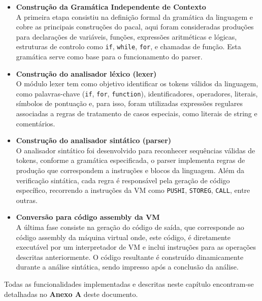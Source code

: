 \documentclass[12pt,a4paper]{report}%
\begin{document}
\begin{itemize}
    \item \textbf{Construção da Gramática Independente de Contexto}\\
    A primeira etapa consistiu na definição formal da gramática da linguagem e cobre as principais construções do pacal, aqui foram consideradas produções para declarações de variáveis, funções, expressões aritméticas e lógicas, estruturas de controlo como \texttt{if}, \texttt{while}, \texttt{for}, e chamadas de função. Esta gramática serve como base para o funcionamento do parser.
    
    \item \textbf{Construção do analisador léxico (lexer)}\\
    O módulo lexer tem como objetivo identificar os tokens válidos da linguagem, como palavras-chave (\texttt{if}, \texttt{for}, \texttt{function}), identificadores, operadores, literais, símbolos de pontuação e, para isso, foram utilizadas expressões regulares associadas a regras de tratamento de casos especiais, como literais de string e comentários.
    
    \item \textbf{Construção do analisador sintático (parser)}\\
    O analisador sintático foi desenvolvido para reconhecer sequências válidas de tokens, conforme a gramática especificada, o parser implementa regras de produção que correspondem a instruções e blocos da linguagem. 
    Além da verificação sintática, cada regra é responsável pela geração de código específico, recorrendo a instruções da VM como \texttt{PUSHI}, \texttt{STOREG}, \texttt{CALL}, entre outras.
    
    \item \textbf{Conversão para código assembly da VM}\\
    A última fase consiste na geração do código de saída, que corresponde ao código assembly da máquina virtual onde, este código, é diretamente executável por um interpretador de VM e inclui instruções para as operações descritas anteriormente. O código resultante é construído dinamicamente durante a análise sintática, sendo impresso após a conclusão da análise.
\end{itemize}

Todas as funcionalidades implementadas e descritas neste capítulo encontram-se detalhadas no \textbf{Anexo A} deste documento.
\end{document}
